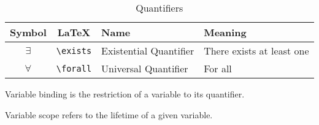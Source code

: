 \documentclass[11pt]{article}
\begin{document}
\begin{table}[!htbp]
    \centering
    \begin{tabular}{ c c l l  }
        \toprule
        Symbol      & LaTeX             & Name                      & Meaning \\
        \midrule
        $\exists$   & \verb|\exists|    & Existential Quantifier    & There exists at least one \\
        $\forall$   & \verb|\forall|    & Universal Quantifier      & For all \\
        \bottomrule
    \end{tabular}
    \label{tab:tbl-quantifiers}
    \caption{Quantifiers}
\end{table}

Variable binding is the restriction of a variable to its quantifier.

Variable scope refers to the lifetime of a given variable.



    
\end{document}
